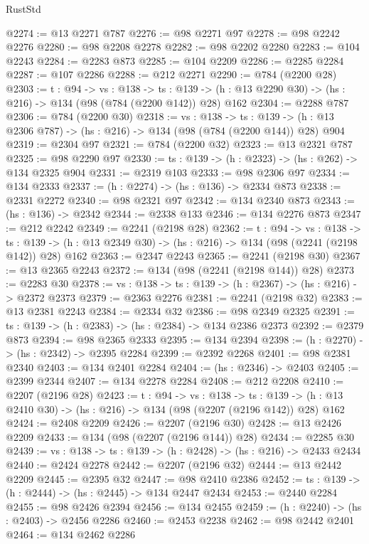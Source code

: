 \begin{lexlean}{RustStd}
\begin{coremodule}
@2274 := @13 @2271 @787
@2276 := @98 @2271 @97
@2278 := @98 @2242 @2276
@2280 := @98 @2208 @2278
@2282 := @98 @2202 @2280
@2283 := @104 @2243
@2284 := @2283 @873
@2285 := @104 @2209
@2286 := @2285 @2284
@2287 := @107 @2286
@2288 := @212 @2271
@2290 := @784 (@2200 @28)
@2303 := {t : @94} ->
  {vs : @138} ->
  {ts : @139} -> (h : @13 @2290 @30) -> (hs : @216) -> @134 (@98 (@784 (@2200 @142)) @28) @162
@2304 := @2288 @787
@2306 := @784 (@2200 @30)
@2318 := {vs : @138} ->
  {ts : @139} -> (h : @13 @2306 @787) -> (hs : @216) -> @134 (@98 (@784 (@2200 @144)) @28) @904
@2319 := @2304 @97
@2321 := @784 (@2200 @32)
@2323 := @13 @2321 @787
@2325 := @98 @2290 @97
@2330 := {ts : @139} -> (h : @2323) -> (hs : @262) -> @134 @2325 @904
@2331 := @2319 @103
@2333 := @98 @2306 @97
@2334 := @134 @2333
@2337 := (h : @2274) -> (hs : @136) -> @2334 @873
@2338 := @2331 @2272
@2340 := @98 @2321 @97
@2342 := @134 @2340 @873
@2343 := (hs : @136) -> @2342
@2344 := @2338 @133
@2346 := @134 @2276 @873
@2347 := @212 @2242
@2349 := @2241 (@2198 @28)
@2362 := {t : @94} ->
  {vs : @138} ->
  {ts : @139} -> (h : @13 @2349 @30) -> (hs : @216) -> @134 (@98 (@2241 (@2198 @142)) @28) @162
@2363 := @2347 @2243
@2365 := @2241 (@2198 @30)
@2367 := @13 @2365 @2243
@2372 := @134 (@98 (@2241 (@2198 @144)) @28)
@2373 := @2283 @30
@2378 := {vs : @138} -> {ts : @139} -> (h : @2367) -> (hs : @216) -> @2372 @2373
@2379 := @2363 @2276
@2381 := @2241 (@2198 @32)
@2383 := @13 @2381 @2243
@2384 := @2334 @32
@2386 := @98 @2349 @2325
@2391 := {ts : @139} -> (h : @2383) -> (hs : @2384) -> @134 @2386 @2373
@2392 := @2379 @873
@2394 := @98 @2365 @2333
@2395 := @134 @2394
@2398 := (h : @2270) -> (hs : @2342) -> @2395 @2284
@2399 := @2392 @2268
@2401 := @98 @2381 @2340
@2403 := @134 @2401 @2284
@2404 := (hs : @2346) -> @2403
@2405 := @2399 @2344
@2407 := @134 @2278 @2284
@2408 := @212 @2208
@2410 := @2207 (@2196 @28)
@2423 := {t : @94} ->
  {vs : @138} ->
  {ts : @139} -> (h : @13 @2410 @30) -> (hs : @216) -> @134 (@98 (@2207 (@2196 @142)) @28) @162
@2424 := @2408 @2209
@2426 := @2207 (@2196 @30)
@2428 := @13 @2426 @2209
@2433 := @134 (@98 (@2207 (@2196 @144)) @28)
@2434 := @2285 @30
@2439 := {vs : @138} -> {ts : @139} -> (h : @2428) -> (hs : @216) -> @2433 @2434
@2440 := @2424 @2278
@2442 := @2207 (@2196 @32)
@2444 := @13 @2442 @2209
@2445 := @2395 @32
@2447 := @98 @2410 @2386
@2452 := {ts : @139} -> (h : @2444) -> (hs : @2445) -> @134 @2447 @2434
@2453 := @2440 @2284
@2455 := @98 @2426 @2394
@2456 := @134 @2455
@2459 := (h : @2240) -> (hs : @2403) -> @2456 @2286
@2460 := @2453 @2238
@2462 := @98 @2442 @2401
@2464 := @134 @2462 @2286

\end{coremodule}
\end{lexlean}
